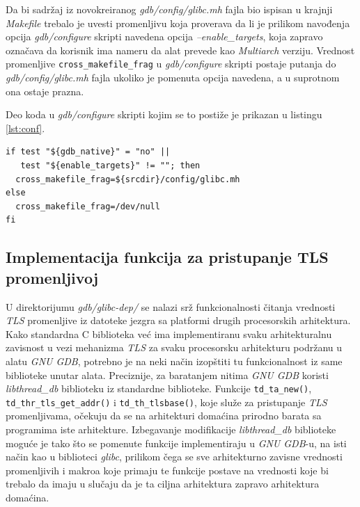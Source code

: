 \documentclass[12pt,oneside]{memoir}
\begin{document}
Da bi sadržaj iz novokreiranog \emph{gdb/config/glibc.mh} fajla bio ispisan u krajnji \emph{Makefile} trebalo je uvesti promenljivu koja proverava da li je prilikom navođenja opcija \emph{gdb/configure} skripti navedena opcija \emph{--enable\_targets}, koja zapravo označava da korisnik ima nameru da alat prevede kao \emph{Multiarch} verziju. Vrednost promenljive \texttt{cross\_makefile\_frag} u \emph{gdb/configure} skripti postaje putanja do \emph{gdb/config/glibc.mh} fajla ukoliko je pomenuta opcija navedena, a u suprotnom ona ostaje prazna.

Deo koda u \emph{gdb/configure} skripti kojim se to postiže je prikazan u listingu \ref{lst:conf}.
\begin{lstlisting}[label={lst:conf}, caption={Izmena \emph{gdb/configure} fajla}]
if test "${gdb_native}" = "no" ||
   test "${enable_targets}" != ""; then
  cross_makefile_frag=${srcdir}/config/glibc.mh
else
  cross_makefile_frag=/dev/null
fi
\end{lstlisting}

\subsection{Implementacija funkcija za pristupanje TLS promenljivoj}

U direktorijumu \emph{gdb/glibc-dep/} se nalazi srž funkcionalnosti čitanja vrednosti \emph{TLS} promenljive iz datoteke jezgra sa platformi drugih procesorskih arhitektura. Kako standardna C biblioteka već ima implementiranu svaku arhitekturalnu zavisnost u vezi mehanizma \emph{TLS} za svaku procesorsku arhitekturu podržanu u alatu \emph{GNU GDB}, potrebno je na neki način izopštiti tu funkcionalnost iz same biblioteke unutar alata. Preciznije, za baratanjem nitima \emph{GNU GDB} koristi \emph{libthread\_db} biblioteku iz standardne biblioteke. Funkcije \texttt{td\_ta\_new()}, \texttt{td\_thr\_tls\_get\_addr()} i \texttt{td\_th\_tlsbase()}, koje služe za pristupanje \emph{TLS} promenljivama, očekuju da se na arhitekturi domaćina prirodno barata sa programima iste arhitekture. Izbegavanje modifikacije \emph{libthread\_db} biblioteke moguće je tako što se pomenute funkcije implementiraju u \emph{GNU GDB}-u, na isti način kao u biblioteci \emph{glibc}, prilikom čega se sve arhitekturno zavisne vrednosti promenljivih i makroa koje primaju te funkcije postave na vrednosti koje bi trebalo da imaju u slučaju da je ta ciljna arhitektura zapravo arhitektura domaćina.
\end{document}
